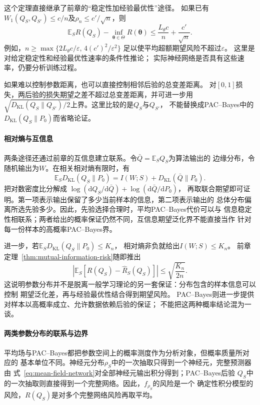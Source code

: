 这个定理直接继承了前章的“稳定性加经验最优性”途径。
如果已有$W_1(Q_S,Q_{S'})\leq c/n$及$\rho_n\leq c'/\sqrt n$，则
\[
 \mathbb E_S R(Q_S)-\inf_{\bm\theta\in\Theta}R(\bm\theta)
 \leq\frac{L_\theta c}{n}+\frac{c'}{\sqrt n}.
\]
例如，$n\geq\max\{2L_\theta c/\varepsilon,\,4(c')^2/\varepsilon^2\}$
足以使平均超额期望风险不超过$\varepsilon$。
这里是对给定稳定性和经验最优性速率的条件性推论；
实际神经网络是否具有这些速率，仍要分析训练过程。

如果难以控制参数距离，也可以直接控制相邻后验的总变差距离。
对$[0,1]$损失，两后验的损失期望之差不超过总变差距离，并可进一步用
$\sqrt{D_{\mathrm{KL}}(Q_S\|Q_{S'})/2}$上界。这里比较的是$Q_S$与$Q_{S'}$，
不能替换成PAC--Bayes中的$D_{\mathrm{KL}}(Q_S\|P_0)$而省略论证。

\paragraph{相对熵与互信息}

两条途径还通过前章的互信息建立联系。令$\bar Q=\mathbb E_S Q_S$为算法输出的
边缘分布，令随机输出为$W$。在相关相对熵有限时，有
\begin{equation}
 \mathbb E_SD_{\mathrm{KL}}(Q_S\|P_0)
 =I(W;S)+D_{\mathrm{KL}}(\bar Q\|P_0).
 \label{eq:pac-bayes-information-decomposition}
\end{equation}
把对数密度比分解成
$\log(\mathrm dQ_S/\mathrm d\bar Q)+\log(\mathrm d\bar Q/\mathrm dP_0)$，
再取联合期望即可证明。第一项表示输出保留了多少当前样本的信息，第二项表示输出的
总体分布偏离所选先验多少。因此，先验选择合理时，平均PAC--Bayes代价可以与
信息稳定性相联系；两者给出的概率保证仍然不同，互信息期望泛化界不能直接当作
针对每一份样本的高概率PAC--Bayes界。

进一步，若$\mathbb E_SD_{\mathrm{KL}}(Q_S\|P_0)\leq K_n$，
相对熵非负就给出$I(W;S)\leq K_n$。
前章定理~\ref{thm:mutual-information-risk}随即推出
\[
 \left|\mathbb E_S[R(Q_S)-\hat R_S(Q_S)]\right|
 \leq\sqrt{\frac{K_n}{2n}}.
\]
这说明参数分布并不是脱离一般学习理论的另一套保证：分布包含的样本信息可以控制
期望泛化差，再与经验最优性结合得到期望风险。
PAC--Bayes则进一步提供对样本以高概率成立、允许数据依赖后验的保证；
不能把这两种概率结论混为一谈。

\paragraph{两类参数分布的联系与边界}

平均场与PAC--Bayes都把参数空间上的概率测度作为分析对象，但概率质量所对应的
基本单位不同。神经元分布$\rho_S$中的一次抽取只得到一个神经元，完整预测器由
式~\eqref{eq:mean-field-network}对全部神经元输出积分得到；PAC--Bayes后验
$Q_S$中的一次抽取则直接得到一个完整网络。因此，$f_{\rho_S}$的风险是一个
确定性积分模型的风险，$R(Q_S)$是对多个完整网络风险再取平均。

